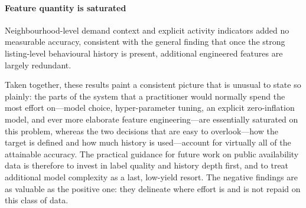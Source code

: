 \documentclass[review,12pt]{elsarticle}
\begin{document}
\paragraph{Feature quantity is saturated}
Neighbourhood-level demand context and explicit activity indicators added no
measurable accuracy, consistent with the general finding that once the strong
listing-level behavioural history is present, additional engineered features are
largely redundant.

Taken together, these results paint a consistent picture that is unusual to state
so plainly: the parts of the system that a practitioner would normally spend the
most effort on---model choice, hyper-parameter tuning, an explicit zero-inflation
model, and ever more elaborate feature engineering---are essentially saturated on
this problem, whereas the two decisions that are easy to overlook---how the target
is defined and how much history is used---account for virtually all of the
attainable accuracy. The practical guidance for future work on public
availability data is therefore to invest in label quality and history depth first,
and to treat additional model complexity as a last, low-yield resort. The negative
findings are as valuable as the positive one: they delineate where effort is and
is not repaid on this class of data.

\end{document}
